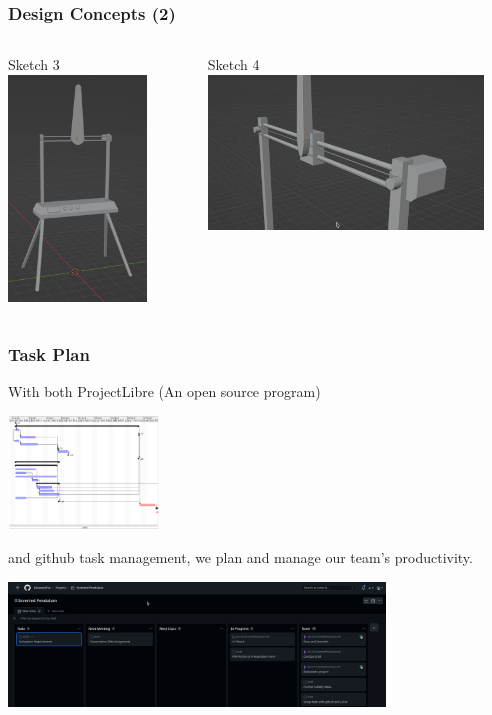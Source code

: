 \documentclass[aspectratio=169]{beamer}
\begin{document}
\begin{frame}
    \frametitle{Design Concepts (2)}

    \begin{columns}
        \begin{column}{0.48\textwidth}
            \begin{block}{Sketch 3}
                \includegraphics[height=6cm]{Full}
            \end{block}
        \end{column}

        \begin{column}{0.48\textwidth}
            \begin{block}{Sketch 4}
                \includegraphics[width=7.3cm]{UpperAssy}
            \end{block}
        \end{column}
    \end{columns}
\end{frame}

\begin{frame}
    \frametitle{Task Plan}

    With both ProjectLibre (An open source program)

    \includegraphics[height=3cm]{ProjectLibre}

    and github task management, we plan and manage our team's productivity.

    \includegraphics[width=10cm]{ProjectPlan}
\end{frame}
\end{document}
